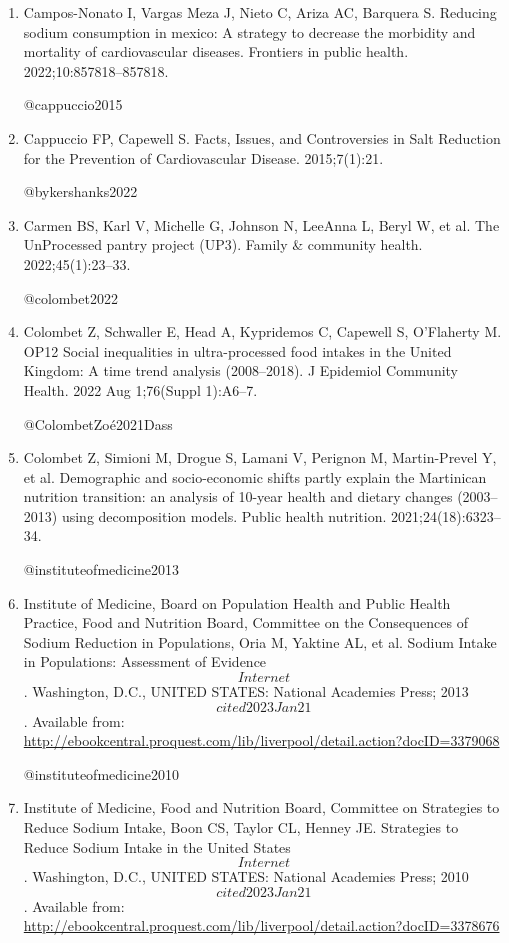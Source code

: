 \documentclass[
]{article}
\begin{document}
\begin{enumerate}
\def\labelenumi{\arabic{enumi}.}
\item
  Campos-Nonato I, Vargas Meza J, Nieto C, Ariza AC, Barquera S.
  Reducing sodium consumption in mexico: A strategy to decrease the
  morbidity and mortality of cardiovascular diseases. Frontiers in
  public health. 2022;10:857818--857818.

  @cappuccio2015
\item
  Cappuccio FP, Capewell S. Facts, Issues, and Controversies in Salt
  Reduction for the Prevention of Cardiovascular Disease. 2015;7(1):21.

  @bykershanks2022
\item
  Carmen BS, Karl V, Michelle G, Johnson N, LeeAnna L, Beryl W, et al.
  The UnProcessed pantry project (UP3). Family \& community health.
  2022;45(1):23--33.

  @colombet2022
\item
  Colombet Z, Schwaller E, Head A, Kypridemos C, Capewell S, O'Flaherty
  M. OP12 Social inequalities in ultra-processed food intakes in the
  United Kingdom: A time trend analysis (2008--2018). J Epidemiol
  Community Health. 2022 Aug 1;76(Suppl 1):A6--7.

  @ColombetZoé2021Dass
\item
  Colombet Z, Simioni M, Drogue S, Lamani V, Perignon M, Martin-Prevel
  Y, et al. Demographic and socio-economic shifts partly explain the
  Martinican nutrition transition: an analysis of 10-year health and
  dietary changes (2003--2013) using decomposition models. Public health
  nutrition. 2021;24(18):6323--34.

  @instituteofmedicine2013
\item
  Institute of Medicine, Board on Population Health and Public Health
  Practice, Food and Nutrition Board, Committee on the Consequences of
  Sodium Reduction in Populations, Oria M, Yaktine AL, et al. Sodium
  Intake in Populations: Assessment of Evidence \[Internet\].
  Washington, D.C., UNITED STATES: National Academies Press; 2013
  \[cited 2023 Jan 21\]. Available from:
  \url{http://ebookcentral.proquest.com/lib/liverpool/detail.action?docID=3379068}

  @instituteofmedicine2010
\item
  Institute of Medicine, Food and Nutrition Board, Committee on
  Strategies to Reduce Sodium Intake, Boon CS, Taylor CL, Henney JE.
  Strategies to Reduce Sodium Intake in the United States \[Internet\].
  Washington, D.C., UNITED STATES: National Academies Press; 2010
  \[cited 2023 Jan 21\]. Available from:
  \url{http://ebookcentral.proquest.com/lib/liverpool/detail.action?docID=3378676}


\end{enumerate}
\end{document}
